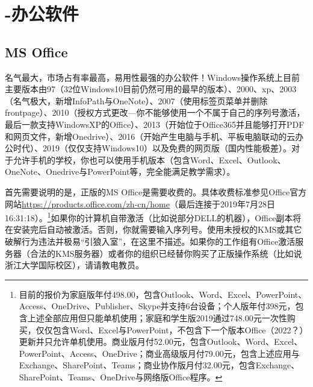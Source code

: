 \section{-办公软件}
\subsection{MS Office}
名气最大，市场占有率最高，易用性最强的办公软件！Windows操作系统上目前主要版本由97（32位Windows10目前仍然可用的最早的版本）、2000、xp、2003（名气极大，新增InfoPath与OneNote）、2007（使用标签页菜单并删除frontpage）、2010（授权方式更改—你不能够使用一个不属于自己的序列号激活，最后一款支持WindowsXP的Office）、2013（开始位于Office365并且能够打开PDF和网页文件，新增Onedrive）、2016（开始产生电脑与手机、平板电脑联动的云办公时代）、2019（仅仅支持Windows10）以及免费的网页版（国内性能极差）。对于允许手机的学校，你也可以使用手机版本（包含Word、Excel、Outlook、OneNote、Onedrive与PowerPoint等，完全能满足教学需求）。\par
首先需要说明的是，正版的MS Office是需要收费的。具体收费标准参见Office官方网站\url{https://products.office.com/zh-cn/home}（最后连接于2019年7月28日16:31:18）。\footnote{目前的报价为家庭版年付498.00，包含Outlook、Word、Excel、PowerPoint、Access、OneDrive、Publisher、Skype并支持6台设备；个人版年付398元，包含上述全部应用但只能单机使用；家庭和学生版2019通过748.00元一次性购买，仅仅包含Word、Excel与PowerPoint，不包含下一个版本Office（2022？）更新并只允许单机使用。商业版月付52.00元，包含Outlook、Word、Excel、PowerPoint、Access、OneDrive；商业高级版月付79.00元，包含上述应用与Exchange、SharePoint、Teams；商业协作版月付32.00元，包含Exchange、SharePoint、Teams、OneDrive与网络版Office程序。}如果你的计算机自带激活（比如说部分DELL的机器），Office副本将在安装完后自动被激活。否则，你就需要输入序列号。使用未授权的KMS或其它破解行为违法并极易“引狼入室”，在这里不描述。如果你的工作组有Office激活服务器（合法的KMS服务器）或者你的组织已经替你购买了正版操作系统（比如说浙江大学国际校区），请请教电教员。
